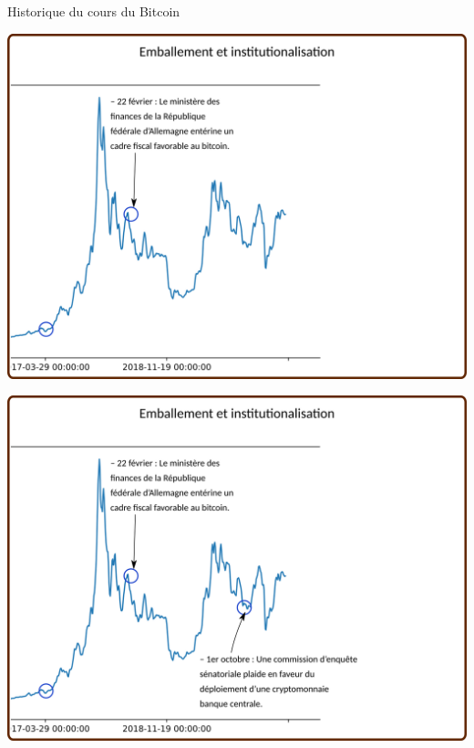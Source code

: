 \documentclass[presentation]{beamer}
\begin{document}
\begin{frame}[label={sec:org6ff9387}]{Historique du cours du Bitcoin}
\begin{block}{}
\begin{center}
\includegraphics[width=.95\textwidth]{./Pictures/Timeline/50emballement_banque.png}
\end{center}
\end{block}

\begin{block}{}
\begin{center}
\includegraphics[width=.95\textwidth]{./Pictures/Timeline/51emballement_senat.png}
\end{center}
\end{block}


\end{frame}
\end{document}
